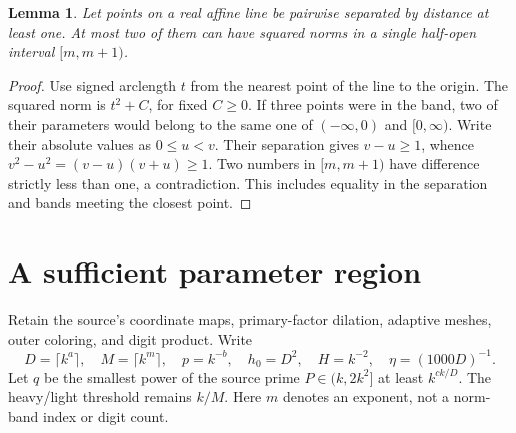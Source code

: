 \documentclass[11pt]{article}
\newtheorem{lemma}{Lemma}
\begin{document}
\begin{lemma}\label{lem:band}
Let points on a real affine line be pairwise separated by distance at
least one. At most two of them can have squared norms in a single
half-open interval $[m,m+1)$.
\end{lemma}
\begin{proof}
Use signed arclength $t$ from the nearest point of the line to the origin.
The squared norm is $t^2+C$, for fixed $C\ge0$. If three points were
in the band, two of their parameters would belong to the same one of
$(-\infty,0)$ and $[0,\infty)$. Write their absolute values as
$0\le u<v$. Their separation gives $v-u\ge1$, whence
$v^2-u^2=(v-u)(v+u)\ge1$. Two numbers in $[m,m+1)$ have difference
strictly less than one, a contradiction. This includes equality in the
separation and bands meeting the closest point.
\end{proof}

\section{A sufficient parameter region}
Retain the source's coordinate maps, primary-factor dilation, adaptive
meshes, outer coloring, and digit product. Write
\[
 D=\lceil k^a\rceil,\quad M=\lceil k^m\rceil,\quad
 p=k^{-b},\quad h_0=D^2,\quad H=k^{-2},\quad
 \eta=(1000D)^{-1}.
\]
Let $q$ be the smallest power of the source prime $P\in(k,2k^2]$
at least $k^{ck/D}$. The heavy/light threshold remains $k/M$.
Here $m$ denotes an exponent, not a norm-band index or digit count.
\end{document}
